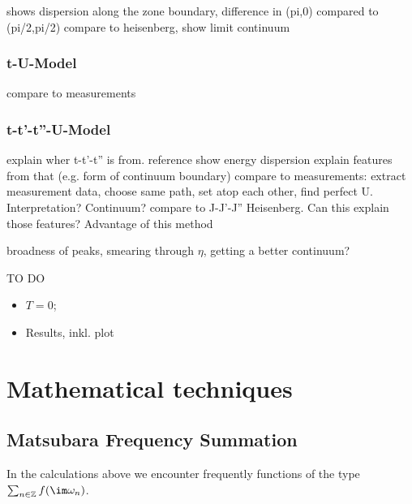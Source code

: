 \documentclass[a4paper,10pt]{report}
\begin{document}
shows dispersion along the zone boundary,
difference in (pi,0) compared to (pi/2,pi/2)
compare to heisenberg, show limit
continuum


\subsection{t-U-Model}
compare to measurements
\subsection{t-t'-t''-U-Model}
explain wher t-t'-t'' is from. reference
show energy dispersion
explain features from that (e.g. form of continuum boundary)
compare to measurements: extract measurement data, choose same path, set atop each other, find perfect U. Interpretation? Continuum?
compare to J-J'-J'' Heisenberg. Can this explain those features? Advantage of this method

broadness of peaks, smearing through $\eta$, getting a better continuum?
\newpage

TO DO
\begin{itemize}
 \item $T=0$;
 \item Results, inkl. plot
\end{itemize}









\appendix

\chapter{Mathematical techniques}

\section{Matsubara Frequency Summation} \label{MFS}

In the calculations above we encounter frequently functions of the type 
$ \sum_{n \in \mathbb{Z}} f(\im \omega_n)$.
\end{document}
